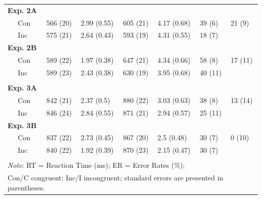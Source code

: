 \documentclass[]{DissertateCUNY}
\begin{document}
\begin{table}[htpb]
{\begin{tabular}{rrcccccc}
&       &       &       &       &       &       &  \\
\midrule
\multicolumn{2}{l}{\textbf{Exp. 2A}}  &   &    &     &     &    &  \\
& \multicolumn{1}{l}{Con} & \multicolumn{1}{l}{566 (20)} & \multicolumn{1}{l}{2.99 (0.55)} & \multicolumn{1}{l}{605 (21)} & \multicolumn{1}{l}{4.17 (0.68)} & \multicolumn{1}{l}{39 (6)} & \multicolumn{1}{l}{21 (9)} \\
& \multicolumn{1}{l}{Inc} & \multicolumn{1}{l}{575 (21)} & \multicolumn{1}{l}{2.64 (0.43)} & \multicolumn{1}{l}{593 (19)} & \multicolumn{1}{l}{4.31 (0.55)} & \multicolumn{1}{l}{18 (7)} & \multicolumn{1}{l}{ } \\
\multicolumn{2}{l}{\textbf{Exp. 2B}} &    &     &     &     &     &  \\
& \multicolumn{1}{l}{Con} & \multicolumn{1}{l}{589 (22)} & \multicolumn{1}{l}{1.97 (0.38)} & \multicolumn{1}{l}{647 (21)} & \multicolumn{1}{l}{4.34 (0.66)} & \multicolumn{1}{l}{58 (8)} & \multicolumn{1}{l}{17 (11)} \\
& \multicolumn{1}{l}{Inc} & \multicolumn{1}{l}{589 (23)} & \multicolumn{1}{l}{2.43 (0.38)} & \multicolumn{1}{l}{630 (19)} & \multicolumn{1}{l}{3.95 (0.68)} & \multicolumn{1}{l}{40 (11)} & \multicolumn{1}{l}{ }  \\
&       &       &       &       &       &       &  \\
\midrule
\multicolumn{2}{l}{\textbf{Exp. 3A}}  &   &    &     &     &    &  \\
& \multicolumn{1}{l}{Con} & \multicolumn{1}{l}{842 (21)} & \multicolumn{1}{l}{2.37 (0.5)} & \multicolumn{1}{l}{880 (22)} & \multicolumn{1}{l}{3.03 (0.63)} & \multicolumn{1}{l}{38 (8)} & \multicolumn{1}{l}{13 (14)}  \\
& \multicolumn{1}{l}{Inc} & \multicolumn{1}{l}{846 (24)} & \multicolumn{1}{l}{2.84 (0.55)} & \multicolumn{1}{l}{871 (21)} & \multicolumn{1}{l}{2.94 (0.57)} & \multicolumn{1}{l}{25 (11)} & \multicolumn{1}{l}{ }  \\
\multicolumn{2}{l}{\textbf{Exp. 3B}} &    &     &     &     &     &  \\
& \multicolumn{1}{l}{Con} & \multicolumn{1}{l}{837 (22)} & \multicolumn{1}{l}{2.73 (0.45)} & \multicolumn{1}{l}{867 (20)} & \multicolumn{1}{l}{2.5 (0.48)} & \multicolumn{1}{l}{30 (7)} & \multicolumn{1}{l}{0 (10)} \\
& \multicolumn{1}{l}{Inc} & \multicolumn{1}{l}{840 (22)} & \multicolumn{1}{l}{1.92 (0.39)} & \multicolumn{1}{l}{870 (23)} & \multicolumn{1}{l}{2.15 (0.47)} & \multicolumn{1}{l}{30 (7)} & \multicolumn{1}{l}{ }  \\
&       &       &       &       &       &       &  \\
\bottomrule
\multicolumn{8}{l}{\textit{Note}: RT = Reaction Time (ms);  ER = Error Rates (\%);  } \\
\multicolumn{8}{l}{Con/C  congruent; Inc/I  incongruent; standard errors are presented in parentheses.} \\
\end{tabular}
}%
\end{table}
\end{document}
